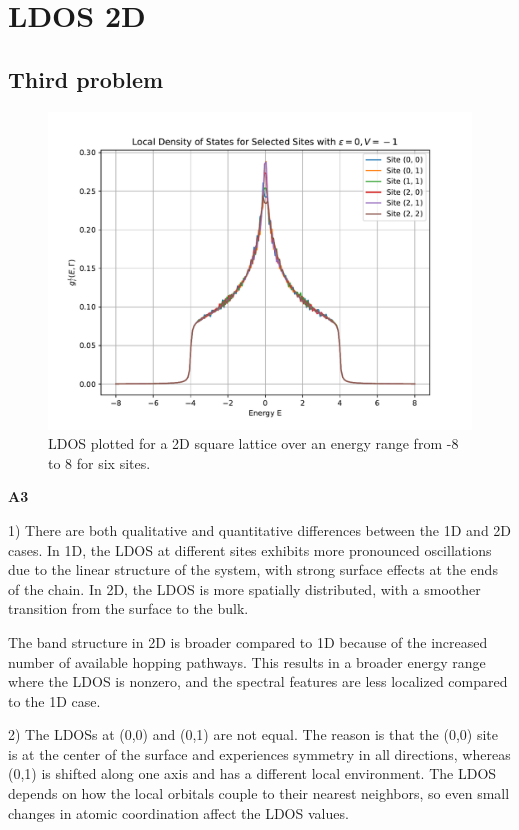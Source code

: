 \section{LDOS 2D}

\subsection{Third problem}

\begin{figure}[H]
    \centering    \includegraphics[width=\textwidth]{Figures/task3.pdf}
    \caption{LDOS plotted for a 2D square lattice over an energy range from -8 to 8 for six sites.}
    \label{fig:task3}
\end{figure}

\textbf{A3}

1)
There are both qualitative and quantitative differences between the 1D and 2D cases. In 1D, the LDOS at different sites exhibits more pronounced oscillations due to the linear structure of the system, with strong surface effects at the ends of the chain. In 2D, the LDOS is more spatially distributed, with a smoother transition from the surface to the bulk.

The band structure in 2D is broader compared to 1D because of the increased number of available hopping pathways. This results in a broader energy range where the LDOS is nonzero, and the spectral features are less localized compared to the 1D case.

2) The LDOSs at (0,0) and (0,1) are not equal. The reason is that the (0,0) site is at the center of the surface and experiences symmetry in all directions, whereas (0,1) is shifted along one axis and has a different local environment. The LDOS depends on how the local orbitals couple to their nearest neighbors, so even small changes in atomic coordination affect the LDOS values.


